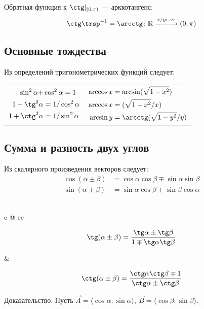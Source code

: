 Обратная функция к $\ctg\vert_{(0;\pi)}$ --- {\bold арккотангенс}:
$$\ctg\trsp^{-1}=\arcctg\colon\mathbb{R}\xrightarrow{x/y\mapsto\alpha}(0;\pi)$$

\subsection{Основные тождества}

Из определений тригонометрических функций следует:

\begin{tabularx}{\textwidth}{C@{\quad\quad}C}
$\begin{aligned}
\sin^2\alpha+&\cos^2\alpha=1\\
1+\tg^2\alpha&=1/\cos^2\alpha\\
1+\ctg^2\alpha&=1/\sin^2\alpha
\end{aligned}$ &
$\begin{aligned}
\arccos x&=\arcsin(\sqrt{1-x^2})\\
\arccos x&=(\sqrt{1-x^2}/x)\\
\arcsin y&=\arcctg(\sqrt{1-y^2}/y)
\end{aligned}$
\end{tabularx}

\vspace*{-6pt}
\subsection{Сумма и разность двух углов}

Из скалярного произведения векторов следует:
\begin{align*}
\cos(\alpha\pm\beta)&=\cos\alpha\cos\beta\mp\sin\alpha\sin\beta\\
\sin(\alpha\pm\beta)&=\sin\alpha\cos\beta\pm\sin\beta\cos\alpha
\end{align*}\leavevmode\\[-10pt]
\begin{tabularc}{0pt}{0pt}{c @{\quad\quad} c}{c}
\parbox{144pt}{$$\tg(\alpha\pm\beta)=\frac{\tg\alpha\pm\tg\beta}{1\mp\tg\alpha\tg\beta}
$$} &
\parbox{150pt}{$$\ctg(\alpha\pm\beta)=\frac{\ctg\alpha\ctg\beta\mp 1}{\ctg\alpha\pm
\ctg\beta}$$}
\end{tabularc}
{\bold Доказательство.} Пусть $\vec{A}=\langle\cos\alpha;\sin\alpha\rangle,\ 
\vec{B}=\langle\cos\beta;\sin\beta\rangle$.\par

